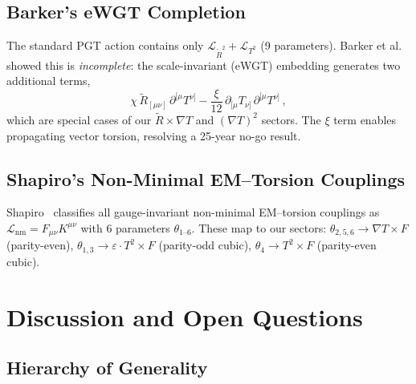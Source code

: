 \documentclass[12pt,a4paper]{article}
\newcommand{\Rt}{\tilde{R}}         %
\newcommand{\del}{\nabla}            %
\newcommand{\pd}{\partial}           %
\newcommand{\eps}{\varepsilon}       %
\begin{document}
\subsection{Barker's eWGT Completion}

The standard PGT action contains only $\mathcal{L}_{\Rt^2}
+ \mathcal{L}_{T^2}$ (9 parameters). Barker et al.~\cite{Barker:2024ydb}
showed this is \emph{incomplete}: the scale-invariant (eWGT)
embedding generates two additional terms,
\begin{equation}
  \chi\, \Rt_{[\mu\nu]}\, \pd^{[\mu} T^{\nu]}
  - \frac{\xi}{12}\, \pd_{[\mu} T_{\nu]}\, \pd^{[\mu} T^{\nu]}\,,
  \label{eq:eWGT}
\end{equation}
which are special cases of our $\Rt \times \del T$ and
$(\del T)^2$ sectors. The $\xi$ term enables propagating vector
torsion, resolving a 25-year no-go result.


\subsection{Shapiro's Non-Minimal EM--Torsion Couplings}

Shapiro~\cite{Shapiro:2001rz} classifies all gauge-invariant
non-minimal EM--torsion couplings as
$\mathcal{L}_{\text{nm}} = F_{\mu\nu} K^{\mu\nu}$
with 6 parameters $\theta_{1\text{--}6}$. These map to our sectors:
$\theta_{2,5,6} \to \del T \times F$ (parity-even),
$\theta_{1,3} \to \eps \cdot T^2 \times F$ (parity-odd cubic),
$\theta_4 \to T^2 \times F$ (parity-even cubic).


\section{Discussion and Open Questions}
\label{sec:discussion}

\subsection{Hierarchy of Generality}
\end{document}
